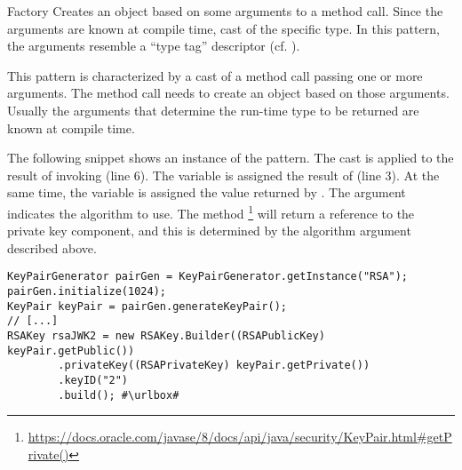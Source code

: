\begin{pattern}{Factory}
Creates an object based on some arguments to a method call.
Since the arguments are known at compile time, cast of the specific type.
In this pattern, the arguments resemble a ``type tag'' descriptor (cf.
).

This pattern is characterized by a cast of a method call passing one or more arguments.
The method call needs to create an object based on those arguments.
Usually the arguments that determine the run-time type to be returned are known at compile time.

\instances{}
The following snippet
shows an instance of the \thisp{} pattern.
The cast is applied to the result of invoking 
(line 6).
The variable  is assigned the result of  (line 3).
At the same time, the  variable is assigned the value returned by .
The argument  indicates the algorithm to use.
The method%
\footnote{\url{https://docs.oracle.com/javase/8/docs/api/java/security/KeyPair.html\#getPrivate()}}
will return a reference to the private key component,
and this is determined by the algorithm argument described above.

\def\urlvar{http://bit.ly/connect2id_oauth_2_0_sdk_with_2HvRlUX}
\begin{verbatim}
KeyPairGenerator pairGen = KeyPairGenerator.getInstance("RSA");
pairGen.initialize(1024);
KeyPair keyPair = pairGen.generateKeyPair();
// [...]
RSAKey rsaJWK2 = new RSAKey.Builder((RSAPublicKey) keyPair.getPublic())
        .privateKey((RSAPrivateKey) keyPair.getPrivate())
        .keyID("2")
        .build(); #\urlbox#
\end{verbatim}


\end{pattern}
